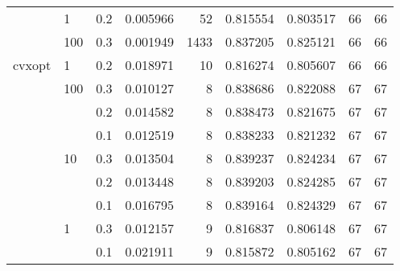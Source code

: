 \begin{table}[H]
\begin{tabular}{lllrrrrrr}
       & 1   & 0.2 &  0.005966 &      52 &  0.815554 &  0.803517 &          66 &        66 \\
       & 100 & 0.3 &  0.001949 &    1433 &  0.837205 &  0.825121 &          66 &        66 \\
cvxopt & 1   & 0.2 &  0.018971 &      10 &  0.816274 &  0.805607 &          66 &        66 \\
       & 100 & 0.3 &  0.010127 &       8 &  0.838686 &  0.822088 &          67 &        67 \\
       &     & 0.2 &  0.014582 &       8 &  0.838473 &  0.821675 &          67 &        67 \\
       &     & 0.1 &  0.012519 &       8 &  0.838233 &  0.821232 &          67 &        67 \\
       & 10  & 0.3 &  0.013504 &       8 &  0.839237 &  0.824234 &          67 &        67 \\
       &     & 0.2 &  0.013448 &       8 &  0.839203 &  0.824285 &          67 &        67 \\
       &     & 0.1 &  0.016795 &       8 &  0.839164 &  0.824329 &          67 &        67 \\
       & 1   & 0.3 &  0.012157 &       9 &  0.816837 &  0.806148 &          67 &        67 \\
       &     & 0.1 &  0.021911 &       9 &  0.815872 &  0.805162 &          67 &        67 \\
\bottomrule
\end{tabular}
\end{table}

